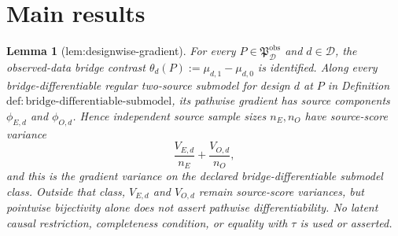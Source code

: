 \documentclass{article}
\newtheorem{lemma}{Lemma}
\begin{document}
\section{Main results}

\begin{lemma}[lem:designwise-gradient]\label{lem:designwise-gradient}
For every \(P\in\mathfrak P_{\mathcal D}^{\mathrm{obs}}\) and \(d\in\mathcal D\), the observed-data bridge contrast \(\theta_d(P):=\mu_{d,1}-\mu_{d,0}\) is identified. Along every bridge-differentiable regular two-source submodel for design \(d\) at \(P\) in Definition~\(\mathrm{def{:}bridge\text{-}differentiable\text{-}submodel}\), its pathwise gradient has source components \(\phi_{E,d}\) and \(\phi_{O,d}\). Hence independent source sample sizes \(n_E,n_O\) have source-score variance
\[
 \frac{V_{E,d}}{n_E}+\frac{V_{O,d}}{n_O},
\]
and this is the gradient variance on the declared bridge-differentiable submodel class. Outside that class, \(V_{E,d}\) and \(V_{O,d}\) remain source-score variances, but pointwise bijectivity alone does not assert pathwise differentiability. No latent causal restriction, completeness condition, or equality with \(\tau\) is used or asserted.
\end{lemma}
\end{document}

